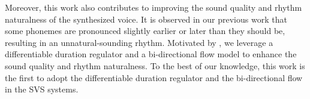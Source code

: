 
Moreover, this work also contributes to improving the sound quality and rhythm naturalness of the synthesized voice. It is observed in our previous work \cite{zhou22f_interspeech} that some phonemes are pronounced slightly earlier or later than they should be, resulting in an unnatural-sounding rhythm. Motivated by \cite{tan2022naturalspeech}, we leverage a differentiable duration regulator and a bi-directional flow model to enhance the sound quality and rhythm naturalness. To the best of our knowledge, this work is the first to adopt the differentiable duration regulator and the bi-directional flow in the SVS systems. 

